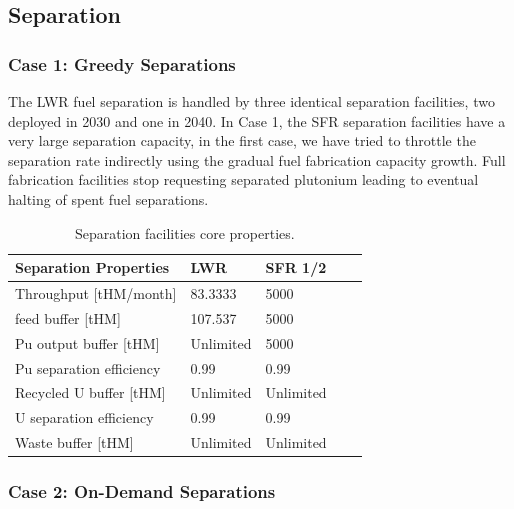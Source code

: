 \documentclass[12pt]{article}
\begin{document}
\subsection{Separation}

\subsubsection{Case 1: Greedy Separations}

The LWR fuel separation is handled by three identical separation facilities,
two deployed in 2030 and one in 2040. In Case 1, the SFR separation facilities have a
very large separation capacity, in the first case, we have tried to throttle
the separation rate indirectly using the gradual fuel fabrication capacity
growth. Full fabrication facilities stop requesting separated plutonium
leading to eventual halting of spent fuel separations.


\begin{table}[h!]
    \centering
    \begin{tabular}{lllll}
    \hline
    Separation Properties         &        LWR              &        SFR 1/2        \\
    \hline
    Throughput [tHM/month]        &        83.3333          &        5000           \\
    feed buffer [tHM]             &        107.537          &        5000           \\
    Pu output buffer [tHM]        &        Unlimited        &        5000           \\
    Pu separation efficiency      &        0.99             &        0.99           \\
    Recycled U buffer [tHM]       &        Unlimited        &        Unlimited      \\
    U separation efficiency       &        0.99             &        0.99           \\
    Waste buffer [tHM]            &        Unlimited        &        Unlimited      \\
    \hline
    \end{tabular}
    \caption{Separation facilities core properties. }
    \label{tab:separation_1}
\end{table}

\subsubsection{Case 2: On-Demand Separations}
\label{sec:case2}
\end{document}
